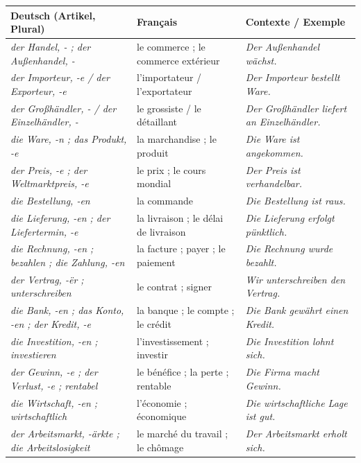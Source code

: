 \documentclass[11pt]{article}
\newcommand{\all}[1]{\ifmmode\text{\textit{#1}}\else\begingroup\selectlanguage{ngerman}\itshape #1\endgroup\fi}
\begin{document}
\begin{propriete}
\begin{center}
\begin{tabularx}{\linewidth}{|l|X|X|}
\hline
\rowcolor{popblueL} \textbf{Deutsch (Artikel, Plural)} & \textbf{Français} & \textbf{Contexte / Exemple} \\
\hline
\all{der Handel, -} ; \all{der Außenhandel, -} & le commerce ; le commerce extérieur & \all{Der Außenhandel wächst.} \\
\hline
\all{der Importeur, -e} / \all{der Exporteur, -e} & l'importateur / l'exportateur & \all{Der Importeur bestellt Ware.} \\
\hline
\all{der Großhändler, -} / \all{der Einzelhändler, -} & le grossiste / le détaillant & \all{Der Großhändler liefert an Einzelhändler.} \\
\hline
\all{die Ware, -n} ; \all{das Produkt, -e} & la marchandise ; le produit & \all{Die Ware ist angekommen.} \\
\hline
\all{der Preis, -e} ; \all{der Weltmarktpreis, -e} & le prix ; le cours mondial & \all{Der Preis ist verhandelbar.} \\
\hline
\all{die Bestellung, -en} & la commande & \all{Die Bestellung ist raus.} \\
\hline
\all{die Lieferung, -en} ; \all{der Liefertermin, -e} & la livraison ; le délai de livraison & \all{Die Lieferung erfolgt pünktlich.} \\
\hline
\all{die Rechnung, -en} ; \all{bezahlen} ; \all{die Zahlung, -en} & la facture ; payer ; le paiement & \all{Die Rechnung wurde bezahlt.} \\
\hline
\all{der Vertrag, -\"{e}r} ; \all{unterschreiben} & le contrat ; signer & \all{Wir unterschreiben den Vertrag.} \\
\hline
\all{die Bank, -en} ; \all{das Konto, -en} ; \all{der Kredit, -e} & la banque ; le compte ; le crédit & \all{Die Bank gewährt einen Kredit.} \\
\hline
\all{die Investition, -en} ; \all{investieren} & l'investissement ; investir & \all{Die Investition lohnt sich.} \\
\hline
\all{der Gewinn, -e} ; \all{der Verlust, -e} ; \all{rentabel} & le bénéfice ; la perte ; rentable & \all{Die Firma macht Gewinn.} \\
\hline
\all{die Wirtschaft, -en} ; \all{wirtschaftlich} & l'économie ; économique & \all{Die wirtschaftliche Lage ist gut.} \\
\hline
\all{der Arbeitsmarkt, -\"{a}rkte} ; \all{die Arbeitslosigkeit} & le marché du travail ; le chômage & \all{Der Arbeitsmarkt erholt sich.} \\
\hline
\end{tabularx}
\end{center}
\end{propriete}
\end{document}

